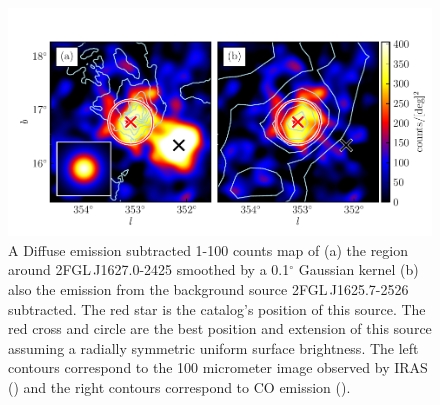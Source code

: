 \documentclass[12pt,preprint]{aastex}
\newcommand{\gev}{\text{GeV}\xspace}
\renewcommand{\deg}{\ensuremath{^\circ}\xspace}
\begin{document}
\begin{figure}
  \begin{center}
    \includegraphics[type=pdf,ext=.pdf,read=.pdf]{source_plots/source_1FGL_J1628.6-2419c}
  \end{center}
  \caption{
  A Diffuse emission subtracted 1-100 \gev counts
  map of (a) the region around 2FGL\,J1627.0-2425 smoothed by a 0.1\deg
  Gaussian kernel (b) also the emission from the background source 
  2FGL\,J1625.7-2526 subtracted.  The red star is the catalog's
  position of this source.  The red cross and circle are the best
  position and extension of this source assuming a radially symmetric
  uniform surface brightness.  The left contours correspond to the
  100 micrometer image observed by IRAS (\cite{iras_rho_ophiuci}) and the right
  contours correspond to CO emission (\cite{co_rho_ophiuci}).
  }\label{1FGL_J1628.6-2419c}
\end{figure}
\end{document}
